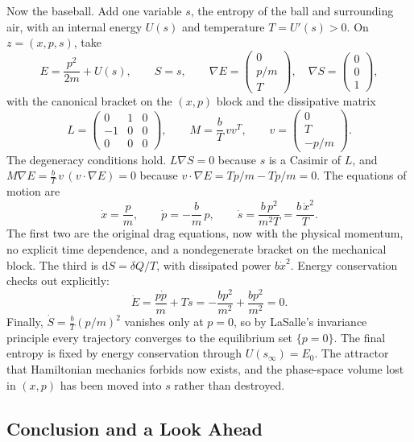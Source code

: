 Now the baseball. Add one variable $s$, the entropy of the ball and surrounding air, with an internal energy $U(s)$ and temperature $T = U'(s) > 0$. On $z = (x,p,s)$, take
\[
	E = \frac{p^2}{2m} + U(s), \qquad S = s, \qquad
	\nabla E = \begin{pmatrix} 0 \\ p/m \\ T \end{pmatrix}, \quad
	\nabla S = \begin{pmatrix} 0 \\ 0 \\ 1 \end{pmatrix},
\]
with the canonical bracket on the $(x,p)$ block and the dissipative matrix
\[
	L = \begin{pmatrix} 0 & 1 & 0 \\ -1 & 0 & 0 \\ 0 & 0 & 0 \end{pmatrix}, \qquad
	M = \frac{b}{T}\, v v^{T}, \qquad
	v = \begin{pmatrix} 0 \\ T \\ -p/m \end{pmatrix}.
\]
The degeneracy conditions hold. $L\nabla S = 0$ because $s$ is a Casimir of $L$, and $M\nabla E = \frac{b}{T}\,v\,(v\cdot\nabla E) = 0$ because $v\cdot\nabla E = Tp/m - Tp/m = 0$. The equations of motion are
\[
	\dot x = \frac{p}{m}, \qquad
	\dot p = -\frac{b}{m}\,p, \qquad
	\dot s = \frac{b\,p^2}{m^2 T} = \frac{b\,\dot x^2}{T} .
\]
The first two are the original drag equations, now with the physical momentum, no explicit time dependence, and a nondegenerate bracket on the mechanical block. The third is $\mathrm{d}S = \delta Q/T$, with dissipated power $b\dot x^2$. Energy conservation checks out explicitly:
\[
	\dot E = \frac{p\dot{p}}{m} + T\dot s = -\frac{b p^2}{m^2} + \frac{b p^2}{m^2} = 0.
\]
Finally, $\dot{S} = \frac{b}{T}(p/m)^2$ vanishes only at $p = 0$, so by LaSalle's invariance principle every trajectory converges to the equilibrium set $\{p = 0\}$. The final entropy is fixed by energy conservation through $U(s_\infty) = E_0$. The attractor that Hamiltonian mechanics forbids now exists, and the phase-space volume lost in $(x,p)$ has been moved into $s$ rather than destroyed.


\subsection{Conclusion and a Look Ahead}

